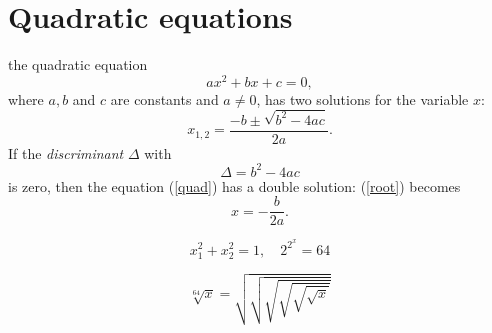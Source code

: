 \documentclass{article}
\begin{document}
\section*{Quadratic equations}
the quadratic equation
\begin{equation}
  \label{quad}
  ax^2 + bx + c = 0,
\end{equation}
where \(a, b\) and \(c \) are constants and $a \neq 0$,
has two solutions for the variable $x$:
\begin{equation}
  \label{root}
  x_{1, 2} = \frac{-b \pm \sqrt{b^2 - 4ac}}{2a}.
\end{equation}
If the \emph{discriminant} $\Delta$ with
$$
\Delta = b^2 - 4 a c
$$
is zero, then the equation (\ref{quad}) has a double solution:
(\ref{root}) becomes
$$
x = -\frac{b}{2a}.
$$

\begin{equation}
   x_1^2 + x_2^2 = 1, \quad 2^{2^x} = 64
\end{equation}

\begin{equation}
   \sqrt[64]{x} = \sqrt{\sqrt{\sqrt{\sqrt{\sqrt{\sqrt{x}}}}}}
\end{equation}
\end{document}
